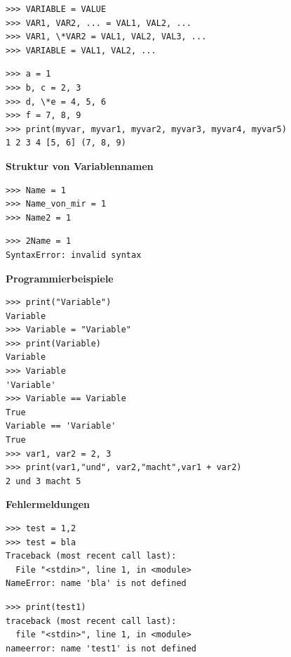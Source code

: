 \begin{verbatim}
>>> VARIABLE = VALUE
>>> VAR1, VAR2, ... = VAL1, VAL2, ...
>>> VAR1, \*VAR2 = VAL1, VAL2, VAL3, ...
>>> VARIABLE = VAL1, VAL2, ...
\end{verbatim}

\begin{verbatim}
>>> a = 1
>>> b, c = 2, 3
>>> d, \*e = 4, 5, 6
>>> f = 7, 8, 9
>>> print(myvar, myvar1, myvar2, myvar3, myvar4, myvar5)
1 2 3 4 [5, 6] (7, 8, 9)
\end{verbatim}



\vspace{0.5cm}\par\noindent\textbf{Struktur von Variablennamen}\vspace{0.5cm}

\begin{verbatim}
>>> Name = 1
>>> Name_von_mir = 1
>>> Name2 = 1
\end{verbatim}

\begin{verbatim}
>>> 2Name = 1
SyntaxError: invalid syntax
\end{verbatim}



\vspace{0.5cm}\par\noindent\textbf{Programmierbeispiele}\vspace{0.5cm}

\begin{verbatim}
>>> print("Variable")
Variable
>>> Variable = "Variable"
>>> print(Variable)
Variable
>>> Variable
'Variable'
>>> Variable == Variable
True
Variable == 'Variable'
True
>>> var1, var2 = 2, 3
>>> print(var1,"und", var2,"macht",var1 + var2)
2 und 3 macht 5
\end{verbatim}



\vspace{0.5cm}\par\noindent\textbf{Fehlermeldungen}\vspace{0.5cm}

\begin{verbatim}
>>> test = 1,2
>>> test = bla
Traceback (most recent call last):
  File "<stdin>", line 1, in <module>
NameError: name 'bla' is not defined
\end{verbatim}

\begin{verbatim}
>>> print(test1)
traceback (most recent call last):
  file "<stdin>", line 1, in <module>
nameerror: name 'test1' is not defined
\end{verbatim}

